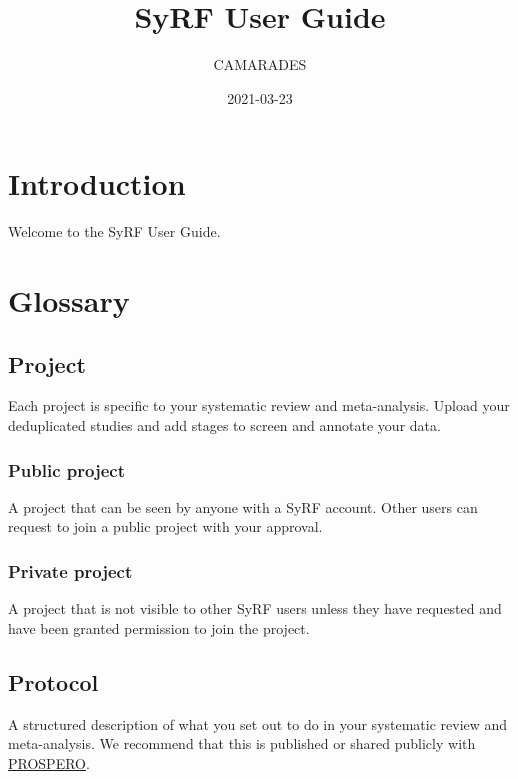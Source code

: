 \documentclass[
]{book}
\title{SyRF User Guide}
\author{CAMARADES}
\date{2021-03-23}
\begin{document}
\maketitle

{
\setcounter{tocdepth}{1}
\tableofcontents
}
\hypertarget{index}{%
\chapter{Introduction}\label{index}}

Welcome to the SyRF User Guide.

\hypertarget{glossary}{%
\chapter{Glossary}\label{glossary}}

\hypertarget{project}{%
\section{Project}\label{project}}

Each project is specific to your systematic review and meta-analysis. Upload your deduplicated studies and add stages to screen and annotate your data.

\hypertarget{public-project}{%
\subsection{Public project}\label{public-project}}

A project that can be seen by anyone with a SyRF account. Other users can request to join a public project with your approval.

\hypertarget{private-project}{%
\subsection{Private project}\label{private-project}}

A project that is not visible to other SyRF users unless they have requested and have been granted permission to join the project.

\hypertarget{protocol}{%
\section{Protocol}\label{protocol}}

A structured description of what you set out to do in your systematic review and meta-analysis. We recommend that this is published or shared publicly with \href{https://www.crd.york.ac.uk/prospero/}{PROSPERO}.
\end{document}
